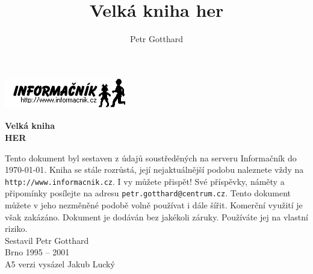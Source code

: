 \documentclass[A5paper,8pt,openany,twoside,draft]{book}
\author{Petr Gotthard}
\title{Velká kniha her}
\begin{document}
\titlepage

{\raggedleft
\includegraphics{inflogo}\\[3 cm]
}

{\centering
{
 \fontsize{2 cm}{2.4 cm}%
 \bfseries%
 Velká kniha
}\\[5mm]
{
 \fontsize{5.5 cm}{6.6 cm}%
 \bfseries%
 HER
}\\[8.5cm]
}

Tento dokument byl sestaven z údajů soustředěných na serveru
Informačník do \today. Kniha se stále rozrůstá, její nejaktuálnější
podobu naleznete vždy na
{\tt http://www.informacnik.cz}.
I vy můžete přispět! Své příspěvky, náměty a připomínky posílejte na adresu
{\tt petr.gotthard@centrum.cz}.
Tento dokument můžete v jeho nezměněné podobě volně používat i dále šířit. 
Komerční využití je však zakázáno.
Dokument je dodáván bez jakékoli záruky. Používáte jej na vlastní
riziko.\\[1 cm]

{\centering
Sestavil Petr Gotthard\\
Brno 1995 -- 2001\\
A5 verzi vysázel Jakub Lucký
\\
}

\cleardoublepage

\renewcommand\multicolumntoc{2}
\tableofcontents
\cleardoublepage

\renewcommand\Large{\fontfamily{phv}\fontsize{10}{12}\selectfont}
\renewcommand\large{\fontfamily{phv}\fontsize{7}{8.4}\selectfont}


\newcommand{\nadpis}[2]{%
 \vskip 3ex%
 \addtocounter{#2}{1}%
 \noindent%
 {
  \fontfamily{phv}%
  \fontsize{7}{8.4}%
  \bfseries%
  \arabic{#2}.%
  \hspace{1.5mm}#1%
 }%
 \nopagebreak%
 \vskip 1ex%
}

\newenvironment{intabular}[1]{%
 \noindent%
 \begin{tabular}{#1}%
}{%
 \end{tabular}%
}

\newenvironment{intabularx}[1]{%
 \noindent%
 \tabularx{\columnwidth}{#1}%
}{%
 \endtabularx%
}
\end{document}
